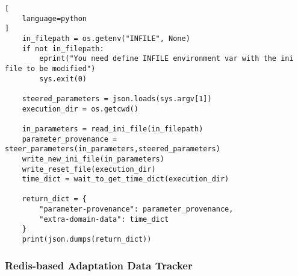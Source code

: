 \begin{lstlisting}[
    language=python
]
    in_filepath = os.getenv("INFILE", None)
    if not in_filepath:
        eprint("You need define INFILE environment var with the ini file to be modified")
        sys.exit(0)

    steered_parameters = json.loads(sys.argv[1])
    execution_dir = os.getcwd()

    in_parameters = read_ini_file(in_filepath)
    parameter_provenance = steer_parameters(in_parameters,steered_parameters)
    write_new_ini_file(in_parameters)
    write_reset_file(execution_dir)
    time_dict = wait_to_get_time_dict(execution_dir)

    return_dict = {
        "parameter-provenance": parameter_provenance,
        "extra-domain-data": time_dict
    }
    print(json.dumps(return_dict))
\end{lstlisting}



\subsubsection{Redis-based Adaptation Data Tracker}

